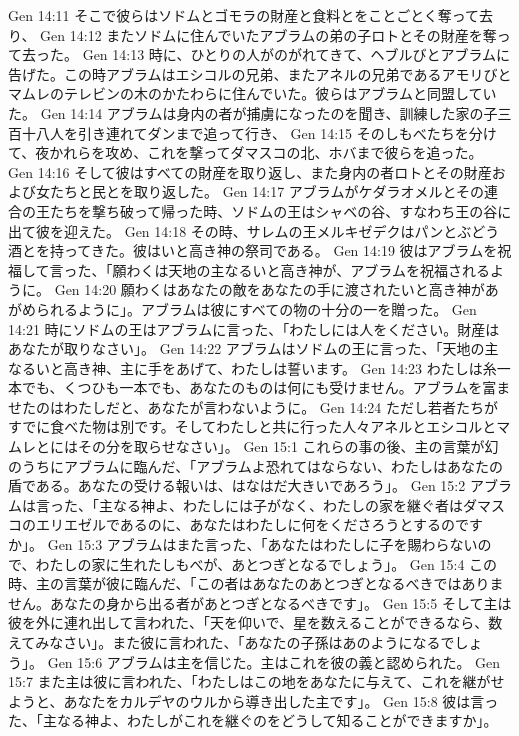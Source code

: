 Gen 14:11  そこで彼らはソドムとゴモラの財産と食料とをことごとく奪って去り、
Gen 14:12  またソドムに住んでいたアブラムの弟の子ロトとその財産を奪って去った。
Gen 14:13  時に、ひとりの人がのがれてきて、ヘブルびとアブラムに告げた。この時アブラムはエシコルの兄弟、またアネルの兄弟であるアモリびとマムレのテレビンの木のかたわらに住んでいた。彼らはアブラムと同盟していた。
Gen 14:14  アブラムは身内の者が捕虜になったのを聞き、訓練した家の子三百十八人を引き連れてダンまで追って行き、
Gen 14:15  そのしもべたちを分けて、夜かれらを攻め、これを撃ってダマスコの北、ホバまで彼らを追った。
Gen 14:16  そして彼はすべての財産を取り返し、また身内の者ロトとその財産および女たちと民とを取り返した。
Gen 14:17  アブラムがケダラオメルとその連合の王たちを撃ち破って帰った時、ソドムの王はシャベの谷、すなわち王の谷に出て彼を迎えた。
Gen 14:18  その時、サレムの王メルキゼデクはパンとぶどう酒とを持ってきた。彼はいと高き神の祭司である。
Gen 14:19  彼はアブラムを祝福して言った、「願わくは天地の主なるいと高き神が、アブラムを祝福されるように。
Gen 14:20  願わくはあなたの敵をあなたの手に渡されたいと高き神があがめられるように」。アブラムは彼にすべての物の十分の一を贈った。
Gen 14:21  時にソドムの王はアブラムに言った、「わたしには人をください。財産はあなたが取りなさい」。
Gen 14:22  アブラムはソドムの王に言った、「天地の主なるいと高き神、主に手をあげて、わたしは誓います。
Gen 14:23  わたしは糸一本でも、くつひも一本でも、あなたのものは何にも受けません。アブラムを富ませたのはわたしだと、あなたが言わないように。
Gen 14:24  ただし若者たちがすでに食べた物は別です。そしてわたしと共に行った人々アネルとエシコルとマムレとにはその分を取らせなさい」。
Gen 15:1  これらの事の後、主の言葉が幻のうちにアブラムに臨んだ、「アブラムよ恐れてはならない、わたしはあなたの盾である。あなたの受ける報いは、はなはだ大きいであろう」。
Gen 15:2  アブラムは言った、「主なる神よ、わたしには子がなく、わたしの家を継ぐ者はダマスコのエリエゼルであるのに、あなたはわたしに何をくださろうとするのですか」。
Gen 15:3  アブラムはまた言った、「あなたはわたしに子を賜わらないので、わたしの家に生れたしもべが、あとつぎとなるでしょう」。
Gen 15:4  この時、主の言葉が彼に臨んだ、「この者はあなたのあとつぎとなるべきではありません。あなたの身から出る者があとつぎとなるべきです」。
Gen 15:5  そして主は彼を外に連れ出して言われた、「天を仰いで、星を数えることができるなら、数えてみなさい」。また彼に言われた、「あなたの子孫はあのようになるでしょう」。
Gen 15:6  アブラムは主を信じた。主はこれを彼の義と認められた。
Gen 15:7  また主は彼に言われた、「わたしはこの地をあなたに与えて、これを継がせようと、あなたをカルデヤのウルから導き出した主です」。
Gen 15:8  彼は言った、「主なる神よ、わたしがこれを継ぐのをどうして知ることができますか」。

